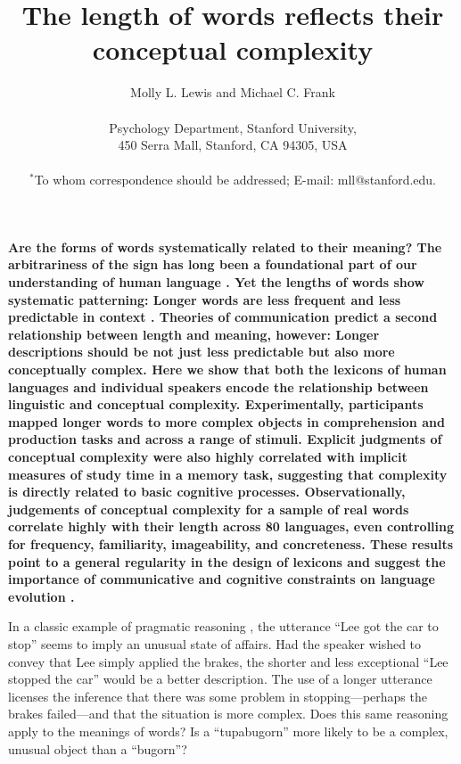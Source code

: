 \documentclass[12pt]{article}
\title{The length of words reflects their conceptual complexity}
\author
{Molly L. Lewis and Michael C. Frank\\
\\
\normalsize{Psychology Department, Stanford University,}\\
\normalsize{450 Serra Mall, Stanford, CA 94305, USA}\\
\\
\normalsize{$^\ast$To whom correspondence should be addressed; E-mail: mll@stanford.edu.}
}
\date{}
\newenvironment{sciabstract}{%
\begin{quote} \bf}
{\end{quote}}
\begin{document}
 

\baselineskip24pt

\maketitle 




{\bf Are the forms of words systematically related to their meaning? The arbitrariness of the sign has long been a foundational part of our understanding of human language \cite{saussure,hockett1960}. Yet the lengths of words show systematic patterning: Longer words are less frequent and less predictable in context \cite{zipf1936,piantadosi2011a}. Theories of communication predict a second relationship between length and meaning, however: Longer descriptions should be not just less predictable but also more conceptually complex\cite{horn1984, levy2006}. Here we show that both the lexicons of human languages and individual speakers encode the relationship between linguistic and conceptual complexity. Experimentally, participants mapped longer words to more complex objects in comprehension and production tasks and across a range of stimuli. Explicit judgments of conceptual complexity were also highly correlated with implicit measures of study time in a memory task, suggesting that complexity is directly related to basic cognitive processes. Observationally, judgements of conceptual complexity for a sample of real words correlate highly with their length across 80 languages, even controlling for frequency, familiarity, imageability, and concreteness. These results point to a general regularity in the design of lexicons and suggest the importance of communicative and cognitive constraints on language evolution \cite{christiansen2008,lieberman2007}.}



In a classic example of pragmatic reasoning \cite{horn1984}, the utterance ``Lee got the car to stop'' seems to imply an unusual state of affairs. Had the speaker wished to convey that Lee simply applied the brakes, the shorter and less exceptional ``Lee stopped the car'' would be a better description. The use of a longer utterance licenses the inference that there was some problem in stopping---perhaps the brakes failed---and that the situation is more complex. Does this same reasoning apply to the meanings of words? Is a ``tupabugorn'' more likely to be a complex, unusual object than a ``bugorn''? 
\end{document}
